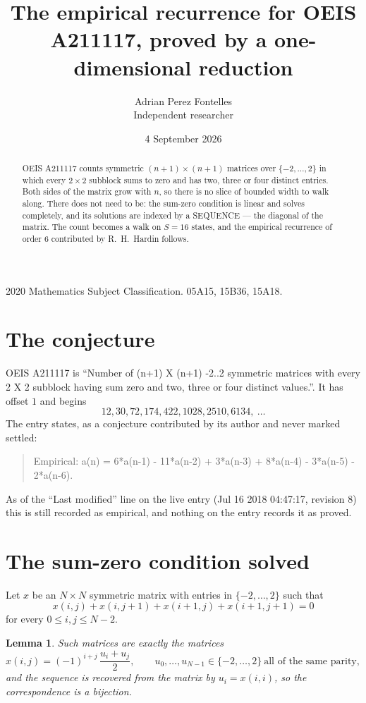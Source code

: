 \documentclass[11pt,a4paper]{article}
\title{The empirical recurrence for OEIS A211117, proved by a one-dimensional reduction}
\author{Adrian Perez Fontelles\\ \small Independent researcher}
\date{4 September 2026}
\theoremstyle{plain}
\newtheorem{lemma}[theorem]{Lemma}
\theoremstyle{definition}
\begin{document}
\maketitle

\begin{abstract}
OEIS A211117 counts symmetric $(n+1)\times(n+1)$ matrices over
$\{-2,\dots,2\}$ in which every $2\times2$ subblock sums to zero and has two, three or four distinct
entries. Both sides of the matrix grow with $n$, so there is no slice of bounded width to walk
along. There does not need to be: the sum-zero condition is linear and solves completely, and
its solutions are indexed by a SEQUENCE --- the diagonal of the matrix. The count becomes a walk
on $S=16$ states, and the empirical recurrence of order $6$ contributed by R.~H.~Hardin
follows.
\end{abstract}

\noindent\small 2020 Mathematics Subject Classification. 05A15, 15B36, 15A18.\normalsize

\section{The conjecture}

OEIS A211117 is ``Number of (n+1) X (n+1) -2..2 symmetric matrices with every 2 X 2 subblock having sum zero and two, three or four distinct values.''. It has offset $1$ and begins
\[
12, 30, 72, 174, 422, 1028, 2510, 6134,\ \dots
\]
The entry states, as a conjecture contributed by its author and never marked settled:
\begin{quote}
Empirical: a(n) = 6*a(n-1) - 11*a(n-2) + 3*a(n-3) + 8*a(n-4) - 3*a(n-5) - 2*a(n-6).
\end{quote}
As of the ``Last modified'' line on the live entry (Jul 16 2018 04:47:17, revision 8) this is still
recorded as empirical, and nothing on the entry records it as proved.

\section{The sum-zero condition solved}

Let $x$ be an $N\times N$ symmetric matrix with entries in $\{-2,\dots,2\}$ such that
\[
x(i,j)+x(i,j{+}1)+x(i{+}1,j)+x(i{+}1,j{+}1)=0
\]
for every $0\le i,j\le N-2$.

\begin{lemma}\label{lem:solve}
Such matrices are exactly the matrices
\[
x(i,j)=(-1)^{i+j}\,\frac{u_i+u_j}{2},
\qquad u_0,\dots,u_{N-1}\in\{-2,\dots,2\}\ \text{all of the same parity},
\]
and the sequence is recovered from the matrix by $u_i=x(i,i)$, so the correspondence is a
bijection.
\end{lemma}
\end{document}
